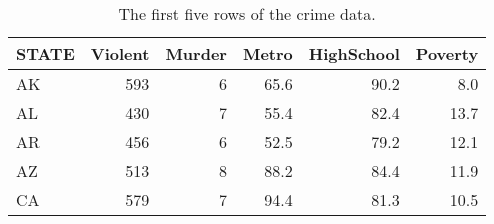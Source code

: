 \begin{table}[!h]

\caption{\label{tab:crime-data}The first five rows of the crime data.}
\centering
\begin{tabular}[t]{lrrrrr}
\toprule
STATE & Violent & Murder & Metro & HighSchool & Poverty\\
\midrule
AK & 593 & 6 & 65.6 & 90.2 & 8.0\\
AL & 430 & 7 & 55.4 & 82.4 & 13.7\\
AR & 456 & 6 & 52.5 & 79.2 & 12.1\\
AZ & 513 & 8 & 88.2 & 84.4 & 11.9\\
CA & 579 & 7 & 94.4 & 81.3 & 10.5\\
\bottomrule
\end{tabular}
\end{table}
